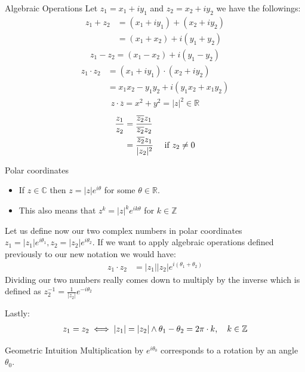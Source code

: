 \begin{parag}{Algebraic Operations}
    Let $z_1 = x_1 + iy_1$ and $z_2 = x_2 + iy_2$ we have the followings:
		 \begin{align*} 
				z_1 + z_2 &= \left(x_1 + iy_1\right) + \left(x_2 + iy_2\right)\\
						  &= \left(x_1 + x_2\right) + i \left(y_1 + y_2\right)
			\end{align*}
		 \begin{align*} 
				z_1 - z_2 = \left(x_1 - x_2\right) + i \left(y_1 - y_2\right)
			\end{align*}
		\begin{align*} 
			z_1 \cdot z_2 &= (x_1 + iy_1) \cdot \left(x_2 + iy_2\right)\\
						  &= x_1x_2 - y_1y_2 + i\left( y_1x_2 + x_1y_2\right)
		\end{align*}
	\begin{align*} 
		z \cdot  \overline{z} = x^2 + y^2 = |z|^2 \in \mathbb{R}
	\end{align*}
		\begin{align*} 
			\frac{z_1}{z_2} &= \frac{\overline{z_2}z_1}{\overline{z_2}z_2}\\
							&= \frac{\overline{z_2}z_1}{|z_2|^2} \quad \text{ if } z_2 \neq 0
		\end{align*}
	
\end{parag}



\begin{parag}{Polar coordinates}
	\begin{itemize}
		\item If $z \in \mathbb{C}$ then $z =  |z|e^{i\theta}$ for some $\theta \in \mathbb{R}$.
		\item This also means that $z^{k} =  |z|^{k}e^{ik\theta}$ for $k \in \mathbb{Z}$
	\end{itemize}

	Let us define now our two complex numbers in polar coordinates $z_1 = |z_1|e^{i\theta_1}, z_2 = |z_2|e^{i\theta_2}$. If we want to apply algebraic operations defined previously to our new notation we would have:
	\begin{align*} z_1 \cdot  z_2 &= |z_1||z_2| e^{i\left(\theta_1 + \theta_2\right)} \end{align*}
	Dividing our two numbers really comes down to multiply by the inverse which is defined as $z_2^{-1} = \frac{1}{|z_2|}e^{-i\theta_2}$

	Lastly:
	\begin{align*} z_1 = z_2 \iff |z_1| = |z_2| \land \theta_1 - \theta_2 =  2\pi \cdot  k, \quad k \in \mathbb{Z}  \end{align*}
	\begin{subparag}{Geometric Intuition}
	    Multiplication by $e^{i\theta_0}$ corresponds to a rotation by an angle $\theta_0$.
	\end{subparag}
\end{parag}

